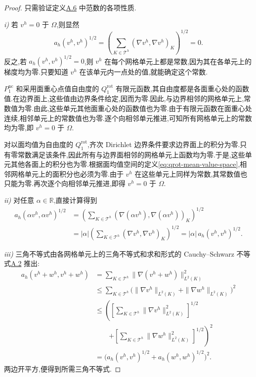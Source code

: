 \begin{proof}
只需验证定义\hyperref[def:appendix-a-6]{A.6} 中范数的各项性质.

\textit{i)} 若 $v^h=0$ 于 $\Omega$,则显然
\[
  a_h(v^h,v^h)^{1/2}
  =\left(\sum_{K\in\mathcal{T}^h}
      (\nabla v^h,\nabla v^h)_K\right)^{1/2}=0.
\]
反之,若 $a_h(v^h,v^h)^{1/2}=0$,则 $v^h$ 在每个网格单元上都是常数,因为其在各单元上的梯度均为零.只要知道 $v^h$ 在该单元内一点处的值,就能确定这个常数.

$P_1^{\mathrm{nc}}$ 和采用面重心点值自由度的 $Q_1^{\mathrm{rot}}$ 有限元函数,其自由度都是各面重心处的函数值.在边界面上,这些值由边界条件给定,因而为零.因此,与边界相邻的网格单元上,常数值为零.由此,这些单元其他面重心处的函数值也为零.由于有限元函数在面重心处连续,相邻单元上的常数值也为零.逐个向相邻单元推进,可知所有网格单元上的常数均为零,即 $v^h=0$ 于 $\Omega$.

对以面均值为自由度的 $Q_1^{\mathrm{rot}}$,齐次 Dirichlet 边界条件要求边界面上的积分为零.只有零常数满足该条件,因此所有与边界面相邻的网格单元上函数均为零.于是,这些单元其他各面上的积分也为零.根据面均值空间的定义\cref{eq:qrot-mean-value-space},相邻网格单元上的面积分也必须为零.由于 $v^h$ 在这些单元上同样为常数,其常数值也只能为零.再次逐个向相邻单元推进,即得 $v^h=0$ 于 $\Omega$.

\textit{ii)} 对任意 $\alpha\in\mathbb{R}$,直接计算得到
\[
\begin{aligned}
  a_h(\alpha v^h,\alpha v^h)^{1/2}
   &=\left(\sum_{K\in\mathcal{T}^h}
      (\nabla(\alpha v^h),\nabla(\alpha v^h))_K\right)^{1/2}\\
   &=|\alpha|
      \left(\sum_{K\in\mathcal{T}^h}
      (\nabla v^h,\nabla v^h)_K\right)^{1/2}
    =|\alpha|\,a_h(v^h,v^h)^{1/2}.
\end{aligned}
\]

\textit{iii)} 三角不等式由各网格单元上的三角不等式和求和形式的 Cauchy--Schwarz 不等式\hyperref[eq:appendix-a-2]{A.2} 推出:
\[
\begin{aligned}
  a_h(v^h+w^h,v^h+w^h)
   &=\sum_{K\in\mathcal{T}^h}
       \|\nabla(v^h+w^h)\|_{L^2(K)}^2\\
   &\le\sum_{K\in\mathcal{T}^h}
       \bigl(\|\nabla v^h\|_{L^2(K)}
             +\|\nabla w^h\|_{L^2(K)}\bigr)^2\\
   &\le
    \left(
      \left[\sum_{K\in\mathcal{T}^h}
        \|\nabla v^h\|_{L^2(K)}^2\right]^{1/2}
      \right.\\[-2pt]
   &\hspace{2em}\left.
      +\left[\sum_{K\in\mathcal{T}^h}
        \|\nabla w^h\|_{L^2(K)}^2\right]^{1/2}
    \right)^2\\
   &=\bigl(a_h(v^h,v^h)^{1/2}
           +a_h(w^h,w^h)^{1/2}\bigr)^2.
\end{aligned}
\]
两边开平方,便得到所需三角不等式.
\end{proof}

